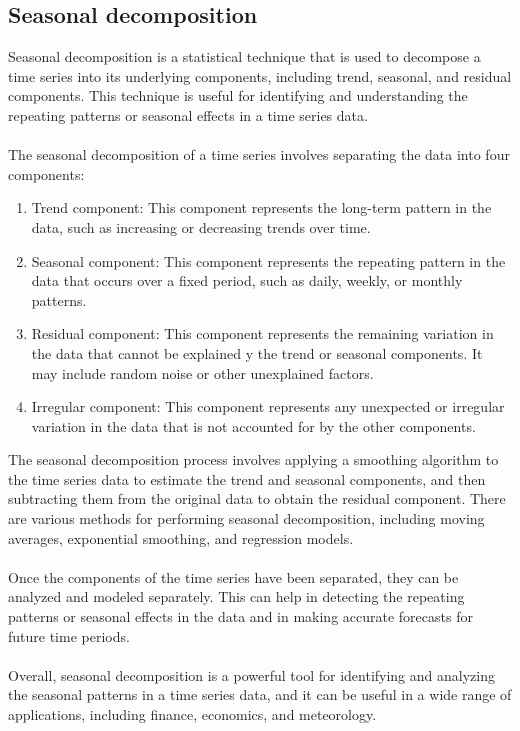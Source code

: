         \subsection{Seasonal decomposition} \label{subsec:seasonaldec}
        Seasonal decomposition is a statistical technique that is used to decompose a time series into its underlying components, including trend,
        seasonal, and residual components. This technique is useful for identifying and understanding the repeating patterns or seasonal
        effects in a time series data.\\
        \\
        The seasonal decomposition of a time series involves separating the data into four components:
        \begin{enumerate}
            \item Trend component: This component represents the long-term pattern in the data, such as increasing or decreasing trends over time.
            \item Seasonal component: This component represents the repeating pattern in the data that occurs over a fixed period,
            such as daily, weekly, or monthly patterns.
            \item Residual component: This component represents the remaining variation in the data that cannot be explained 
            y the trend or seasonal components. It may include random noise or other unexplained factors.
            \item Irregular component: This component represents any unexpected or irregular variation in the data that is not
            accounted for by the other components.
        \end{enumerate}
        The seasonal decomposition process involves applying a smoothing algorithm to the time series data to estimate the trend and
        seasonal components, and then subtracting them from the original data to obtain the residual component.
        There are various methods for performing seasonal decomposition, including moving averages, exponential smoothing, and regression models.\\
        \\
        Once the components of the time series have been separated, they can be analyzed and modeled separately.
        This can help in detecting the repeating patterns or seasonal effects in the data and in making accurate forecasts for future time periods.\\
        \\
        Overall, seasonal decomposition is a powerful tool for identifying and analyzing the seasonal patterns in a time series
        data, and it can be useful in a wide range of applications, including finance, economics, and meteorology.\\

